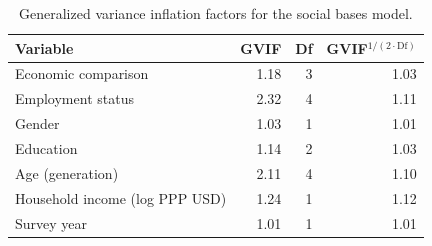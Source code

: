 \begin{table}[!h]
\centering
\caption{Generalized variance inflation factors for the social bases model.}
\centering
\begin{tabular}[t]{lrrr}
\toprule
Variable & GVIF & Df & GVIF$^{1/(2\cdot\text{Df})}$\\
\midrule
Economic comparison & 1.18 & 3 & 1.03\\
Employment status & 2.32 & 4 & 1.11\\
Gender & 1.03 & 1 & 1.01\\
Education & 1.14 & 2 & 1.03\\
Age (generation) & 2.11 & 4 & 1.10\\
Household income (log PPP USD) & 1.24 & 1 & 1.12\\
Survey year & 1.01 & 1 & 1.01\\
\bottomrule
\end{tabular}
\end{table}
